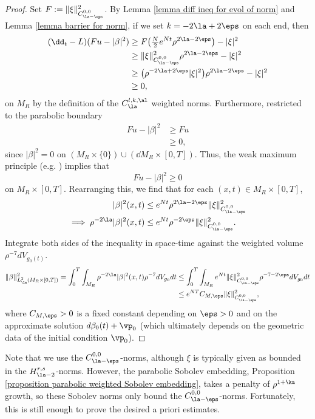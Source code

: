 \documentclass[hidelinks, 12pt, oneside, reqno]{amsart}
\begin{document}
\begin{proof}Set $F := \|\xi\|^2_{C^{0,0}_{\la-\eps}}$. By Lemma \ref{lemma diff ineq for evol of norm} and Lemma \ref{lemma barrier for norm}, if we set $k = - 2\la + 2\eps$ on each end, then
\begin{align*}
    (\dd_t - L)(Fu - |\beta|^2) & \ge F\big( \tfrac{N}{2}e^{Nt}\rho^{2\la - 2\eps} \big) - |\xi|^2 \\
    &\ge \|\xi\|^2_{C^{0,0}_{\la -\eps}} \rho^{2\la - 2\eps} - |\xi|^2 \\
    &\ge \big(\rho^{-2\la + 2\eps}|\xi|^2 \big)\rho^{2\la - 2\eps} - |\xi|^2 \\
    & \ge 0,
\end{align*}
on $M_R$ by the definition of the $C^{l,k,\al}_{\la}$ weighted norms. Furthermore, restricted to the parabolic boundary
\begin{align*}
    Fu - |\beta|^2 &\ge Fu \\
    &\ge 0,
\end{align*}
since $|\beta|^2 = 0$ on $ (M_R \times \{0\}) \cup (\dd M_R \times [0,T])$. Thus, the weak maximum principle (e.g. \cite[Theorem 8 (ii), \S 7.1.4]{EvansPDE}) implies that
\[
Fu - |\beta|^2 \ge 0
\]
on $M_R \times [0,T]$. Rearranging this, we find that for each $(x,t) \in M_R \times [0,T]$,
\begin{align*}
    |\beta|^2(x,t) &\le e^{Nt}\rho^{2\la - 2\eps}\|\xi\|^2_{C^{0,0}_{\la-\eps}} \\
    \implies \rho^{-2\la}|\beta|^2(x,t) &\le e^{Nt}\rho^{-2\eps}\|\xi\|^2_{C^{0,0}_{\la-\eps}}.
\end{align*}
Integrate both sides of the inequality in space-time against the weighted volume $\rho^{-7}dV_{g_0(t)}$.
\begin{align*}
    \|\beta\|^2_{L^2_{\la}(M_R \times [0,T])} = \int_0^T \int_{M_R} \rho^{-2\la}|\beta|^2(x,t)\rho^{-7}dV_{g_0}dt &\le \int_0^T\int_{M_R} e^{Nt}\|\xi\|^2_{C^{0,0}_{\la-\eps}} \rho^{-7-2\eps}dV_{g_0}dt \\
    &\le e^{NT}C_{M,\eps}\|\xi\|^2_{C^{0,0}_{\la-\eps}},
\end{align*}
where $C_{M,\eps}>0$ is a fixed constant depending on $\eps > 0$ and on the approximate solution $d\beta_0(t) + \vp_0$ (which ultimately depends on the geometric data of the initial condition $\vp_0$). 
\end{proof}

\begin{rmk}
Note that we use the $C^{0,0}_{\la - \eps}$-norms, although $\xi$ is typically given as bounded in the $H^{r,s}_{\la-2}$-norms. However, the parabolic Sobolev embedding, Proposition \ref{proposition parabolic weighted Sobolev embedding}, takes a penalty of $\rho^{1+\ka}$ growth, so these Sobolev norms only bound the $C^{0,0}_{\la - \eps}$-norms. Fortunately, this is still enough to prove the desired a priori estimates.
\end{rmk}
\end{document}
